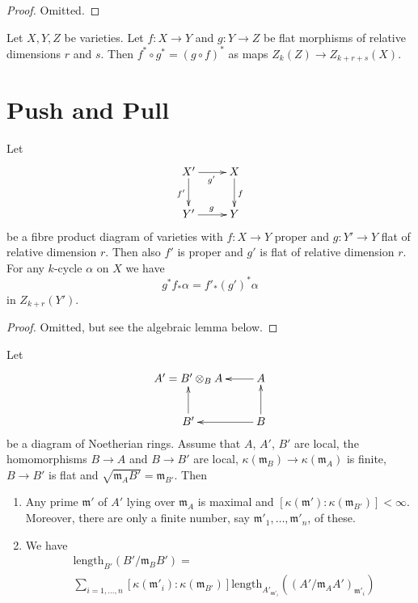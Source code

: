 \begin{proof}
Omitted.
\end{proof}

\begin{lemma}
\label{lemma-compose-flat-pullback}
Let $X, Y, Z$ be varieties.
Let $f : X \to Y$ and $g : Y \to Z$ be flat morphisms of relative dimensions
$r$ and $s$. Then $f^* \circ g^* = (g \circ f)^*$ as maps
$Z_k(Z) \to Z_{k + r + s}(X)$.
\end{lemma}



\section{Push and Pull}
\label{section-push-pull}

\begin{lemma}
\label{lemma-flat-pullback-proper-pushforward}
Let
$$
\xymatrix{
X' \ar[r]_{g'} \ar[d]_{f'} & X \ar[d]^f \\
Y' \ar[r]^g & Y
}
$$
be a fibre product diagram of varieties with $f : X \to Y$ proper and
$g : Y' \to Y$ flat of relative dimension $r$. Then also $f'$ is proper
and $g'$ is flat of relative dimension $r$. For any
$k$-cycle $\alpha$ on $X$ we have
$$
g^*f_*\alpha = f'_*(g')^*\alpha
$$
in $Z_{k + r}(Y')$.
\end{lemma}

\begin{proof}
Omitted, but see the algebraic lemma below.
\end{proof}

\begin{lemma}
\label{lemma-flat-pullback-proper-pushforward-algebra}
Let
$$
\xymatrix{
A' = B' \otimes_B A & A \ar[l] \\
B' \ar[u] & B \ar[l] \ar[u]
}
$$
be a diagram of Noetherian rings. Assume that $A$, $A'$, $B'$ are local,
the homomorphisms $B \to A$ and $B \to B'$ are local,
$\kappa(\mathfrak m_B) \to \kappa(\mathfrak m_A)$ is finite,
$B \to B'$ is flat and $\sqrt{\mathfrak m_A B'} = \mathfrak m_{B'}$.
Then
\begin{enumerate}
\item Any prime $\mathfrak m'$ of $A'$ lying over $\mathfrak m_A$
is maximal and $[\kappa(\mathfrak m') : \kappa(\mathfrak m_{B'})] < \infty$.
Moreover, there are only a finite number, say
$\mathfrak m'_1, \ldots, \mathfrak m'_n$, of these.
\item We have
\begin{align*}
[\kappa(\mathfrak m_A) : \kappa(\mathfrak m_B)]
&
\text{length}_{B'}(B'/\mathfrak m_BB')
= \\
& \sum\nolimits_{i = 1, \ldots, n}
[\kappa(\mathfrak m'_i) : \kappa(\mathfrak m_{B'})]
\text{length}_{A'_{\mathfrak m'_i}}((A'/\mathfrak m_AA')_{\mathfrak m'_i})
\end{align*}
\end{enumerate}
\end{lemma}











